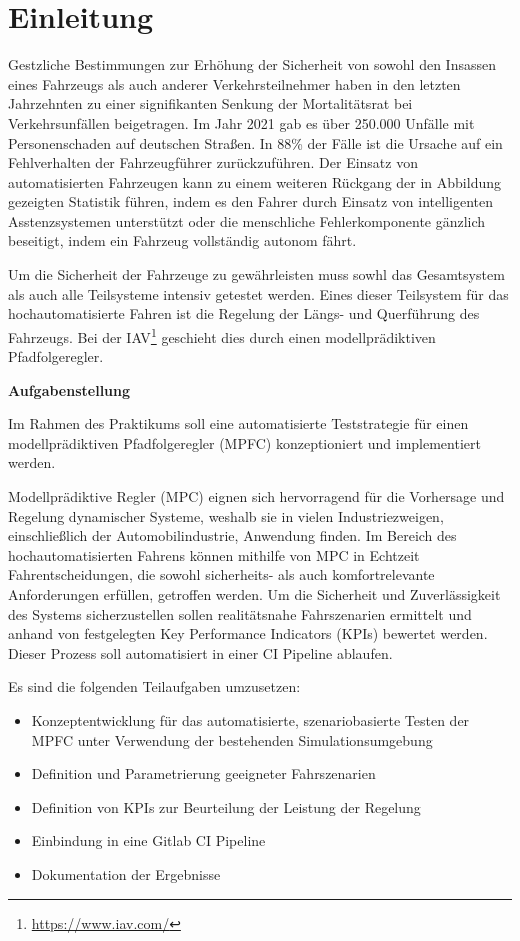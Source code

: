 \chapter{Einleitung} \label{chap:Einleitung}
\thispagestyle{empty}
Gestzliche Bestimmungen zur Erhöhung der Sicherheit von sowohl den Insassen eines Fahrzeugs als auch anderer Verkehrsteilnehmer haben in den letzten Jahrzehnten zu einer signifikanten Senkung der Mortalitätsrat bei Verkehrsunfällen beigetragen.
\noindent Im Jahr 2021 gab es über 250.000 Unfälle mit Personenschaden auf deutschen Straßen. In 88\% der Fälle ist die Ursache auf ein Fehlverhalten der Fahrzeugführer zurückzuführen. Der Einsatz von automatisierten Fahrzeugen kann zu einem weiteren Rückgang der in Abbildung gezeigten Statistik führen, indem es den Fahrer durch Einsatz von intelligenten Asstenzsystemen unterstützt oder die menschliche Fehlerkomponente gänzlich beseitigt, indem ein Fahrzeug vollständig autonom fährt.

Um die Sicherheit der Fahrzeuge zu gewährleisten muss sowhl das Gesamtsystem als auch alle Teilsysteme intensiv getestet werden. Eines dieser Teilsystem für das hochautomatisierte Fahren ist die Regelung der Längs- und Querführung des Fahrzeugs. Bei der IAV\footnote{\url{https://www.iav.com/}} geschieht dies durch einen modellprädiktiven Pfadfolgeregler.\bigskip

\noindent\textbf{Aufgabenstellung}\smallskip

\noindent Im Rahmen des Praktikums soll eine automatisierte Teststrategie für einen modellprädiktiven Pfadfolgeregler (MPFC) konzeptioniert und implementiert werden.

Modellprädiktive Regler (MPC) eignen sich hervorragend für die Vorhersage und Regelung dynamischer Systeme, weshalb sie in vielen Industriezweigen, einschließlich der Automobilindustrie, Anwendung finden. Im Bereich des hochautomatisierten Fahrens können mithilfe von MPC in Echtzeit Fahrentscheidungen, die sowohl sicherheits- als auch komfortrelevante Anforderungen erfüllen, getroffen werden. Um die Sicherheit und Zuverlässigkeit des Systems sicherzustellen sollen realitätsnahe Fahrszenarien ermittelt und anhand von festgelegten Key Performance Indicators (KPIs) bewertet werden. Dieser Prozess soll automatisiert in einer CI Pipeline ablaufen.\medskip

\noindent Es sind die folgenden Teilaufgaben umzusetzen:
\begin{itemize}
    \item Konzeptentwicklung für das automatisierte, szenariobasierte Testen der MPFC unter Verwendung der bestehenden Simulationsumgebung
    \item Definition und Parametrierung geeigneter Fahrszenarien
    \item Definition von KPIs zur Beurteilung der Leistung der Regelung
    \item Einbindung in eine Gitlab CI Pipeline
    \item Dokumentation der Ergebnisse
\end{itemize}
